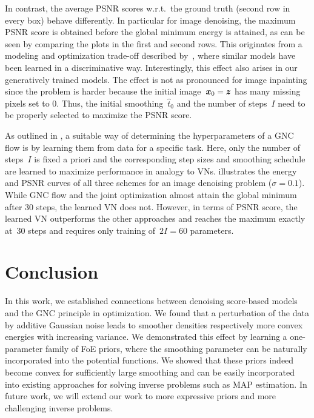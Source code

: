 \documentclass{article}
\def\hatt{{\widehat{t}}}
\theoremstyle{plain}
\theoremstyle{definition}
\theoremstyle{remark}
\begin{document}
In contrast, the average PSNR scores w.r.t.~the ground truth (second row in every box) behave differently.
In particular for image denoising, the maximum PSNR score is obtained before the global minimum energy is attained, as can be seen by comparing the plots in the first and second rows.
This originates from a modeling and optimization trade-off described by~\citet{EfKo20}, where similar models have been learned in a discriminative way.
Interestingly, this effect also arises in our generatively trained models.
The effect is not as pronounced for image inpainting since the problem is harder because the initial image~${\bm{x}}_0={\bm{z}}$ has many missing pixels set to $0$.
Thus, the initial smoothing~$\hatt_0$ and the number of steps~$I$ need to be properly selected to maximize the PSNR score.

As outlined in , a suitable way of determining the hyperparameters of a GNC flow is by learning them from data for a specific task.
Here, only the number of steps~$I$ is fixed a priori and the corresponding step sizes and smoothing schedule are learned to maximize performance in analogy to VNs.
 illustrates the energy and PSNR curves of all three schemes for an image denoising problem ($\sigma=0.1$).
While GNC flow and the joint optimization almost attain the global minimum after $30$ steps, the learned VN does not.
However, in terms of PSNR score, the learned VN outperforms the other approaches and reaches the maximum exactly at~$30$ steps and requires only training of~$2I=60$ parameters.

\section{Conclusion}
In this work, we established connections between denoising score-based models and the GNC principle in optimization.
We found that a perturbation of the data by additive Gaussian noise leads to smoother densities respectively more convex energies with increasing variance.
We demonstrated this effect by learning a one-parameter family of FoE priors, where the smoothing parameter can be naturally incorporated into the potential functions.
We showed that these priors indeed become convex for sufficiently large smoothing and can be easily incorporated into existing approaches for solving inverse problems such as MAP estimation.
In future work, we will extend our work to more expressive priors and more challenging inverse problems.
\end{document}
